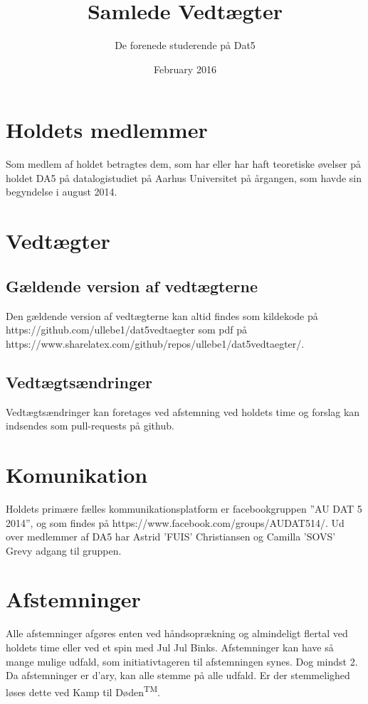 \documentclass{article}
\title{Samlede Vedtægter}
\author{De forenede studerende på Dat5}
\date{February 2016}
\newcommand{\KTD}{Kamp til Døden\textsuperscript{TM}}
\newcommand{\JJB}{Jul Jul Binks}
\begin{document}
	\maketitle

	\section{Holdets medlemmer}
	Som medlem af holdet betragtes dem, som har eller har haft teoretiske øvelser på holdet DA5 på datalogistudiet på Aarhus Universitet på årgangen, som havde sin begyndelse i august 2014.

	\section{Vedtægter}
	\subsection{Gældende version af vedtægterne}
	Den gældende version af vedtægterne kan altid findes som kildekode på\\ https://github.com/ullebe1/dat5vedtaegter som pdf på\\ https://www.sharelatex.com/github/repos/ullebe1/dat5vedtaegter/.
	\subsection{Vedtægtsændringer}
	Vedtægtsændringer kan foretages ved afstemning ved holdets time og forslag kan indsendes som pull-requests på github.

	\section{Komunikation}
	Holdets primære fælles kommunikationsplatform er facebookgruppen ”AU DAT 5 2014”, og som findes på https://www.facebook.com/groups/AUDAT514/. Ud over medlemmer af DA5 har Astrid 'FUIS' Christiansen og Camilla 'SOVS' Grevy adgang til gruppen.

	\section{Afstemninger}
	Alle afstemninger afgøres enten ved håndsoprækning og almindeligt flertal ved holdets time eller ved et spin med \JJB. Afstemninger kan have så mange mulige udfald, som initiativtageren til afstemningen synes. Dog mindst 2. Da afstemninger er d'ary, kan alle stemme på alle udfald. Er der stemmelighed løses dette ved \KTD.
\end{document}
